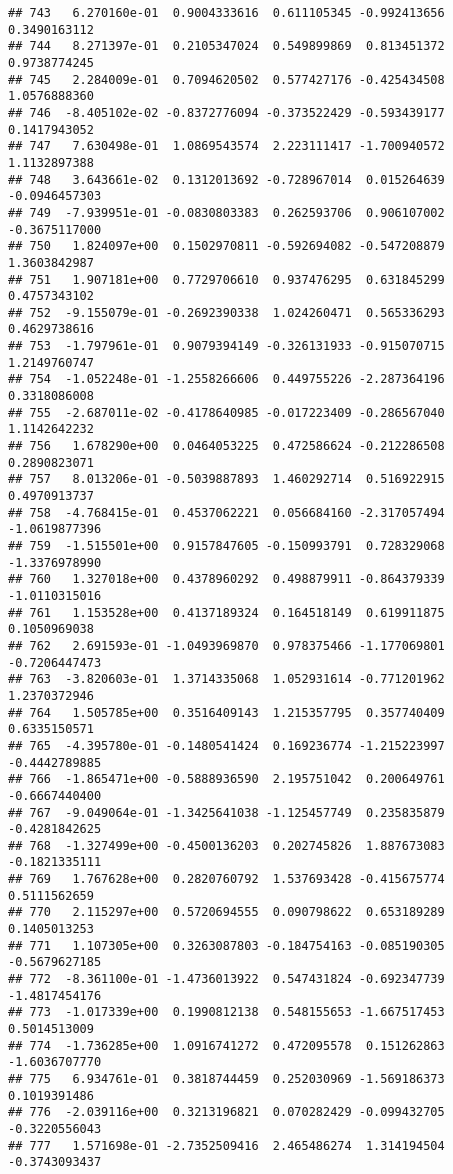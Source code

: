 \documentclass[
]{article}
\begin{document}
\begin{verbatim}
## 743   6.270160e-01  0.9004333616  0.611105345 -0.992413656  0.3490163112
## 744   8.271397e-01  0.2105347024  0.549899869  0.813451372  0.9738774245
## 745   2.284009e-01  0.7094620502  0.577427176 -0.425434508  1.0576888360
## 746  -8.405102e-02 -0.8372776094 -0.373522429 -0.593439177  0.1417943052
## 747   7.630498e-01  1.0869543574  2.223111417 -1.700940572  1.1132897388
## 748   3.643661e-02  0.1312013692 -0.728967014  0.015264639 -0.0946457303
## 749  -7.939951e-01 -0.0830803383  0.262593706  0.906107002 -0.3675117000
## 750   1.824097e+00  0.1502970811 -0.592694082 -0.547208879  1.3603842987
## 751   1.907181e+00  0.7729706610  0.937476295  0.631845299  0.4757343102
## 752  -9.155079e-01 -0.2692390338  1.024260471  0.565336293  0.4629738616
## 753  -1.797961e-01  0.9079394149 -0.326131933 -0.915070715  1.2149760747
## 754  -1.052248e-01 -1.2558266606  0.449755226 -2.287364196  0.3318086008
## 755  -2.687011e-02 -0.4178640985 -0.017223409 -0.286567040  1.1142642232
## 756   1.678290e+00  0.0464053225  0.472586624 -0.212286508  0.2890823071
## 757   8.013206e-01 -0.5039887893  1.460292714  0.516922915  0.4970913737
## 758  -4.768415e-01  0.4537062221  0.056684160 -2.317057494 -1.0619877396
## 759  -1.515501e+00  0.9157847605 -0.150993791  0.728329068 -1.3376978990
## 760   1.327018e+00  0.4378960292  0.498879911 -0.864379339 -1.0110315016
## 761   1.153528e+00  0.4137189324  0.164518149  0.619911875  0.1050969038
## 762   2.691593e-01 -1.0493969870  0.978375466 -1.177069801 -0.7206447473
## 763  -3.820603e-01  1.3714335068  1.052931614 -0.771201962  1.2370372946
## 764   1.505785e+00  0.3516409143  1.215357795  0.357740409  0.6335150571
## 765  -4.395780e-01 -0.1480541424  0.169236774 -1.215223997 -0.4442789885
## 766  -1.865471e+00 -0.5888936590  2.195751042  0.200649761 -0.6667440400
## 767  -9.049064e-01 -1.3425641038 -1.125457749  0.235835879 -0.4281842625
## 768  -1.327499e+00 -0.4500136203  0.202745826  1.887673083 -0.1821335111
## 769   1.767628e+00  0.2820760792  1.537693428 -0.415675774  0.5111562659
## 770   2.115297e+00  0.5720694555  0.090798622  0.653189289  0.1405013253
## 771   1.107305e+00  0.3263087803 -0.184754163 -0.085190305 -0.5679627185
## 772  -8.361100e-01 -1.4736013922  0.547431824 -0.692347739 -1.4817454176
## 773  -1.017339e+00  0.1990812138  0.548155653 -1.667517453  0.5014513009
## 774  -1.736285e+00  1.0916741272  0.472095578  0.151262863 -1.6036707770
## 775   6.934761e-01  0.3818744459  0.252030969 -1.569186373  0.1019391486
## 776  -2.039116e+00  0.3213196821  0.070282429 -0.099432705 -0.3220556043
## 777   1.571698e-01 -2.7352509416  2.465486274  1.314194504 -0.3743093437

\end{verbatim}
\end{document}
